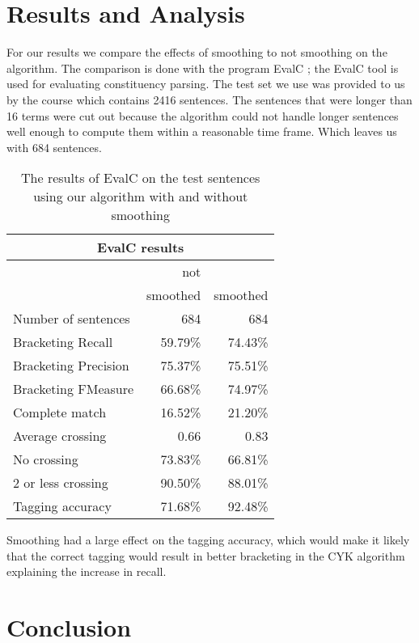\documentclass[11pt,twocolumn]{article}
\begin{document}



\section{Results and Analysis}
For our results we compare the effects of smoothing to not smoothing on the algorithm. The comparison is done with the program EvalC \cite{evalc}; the EvalC tool is used for evaluating constituency parsing. The test set we use was provided to us by the course which contains 2416 sentences. The sentences that were longer than 16 terms were cut out because the algorithm could not handle longer sentences well enough to compute them within a reasonable time frame. Which leaves us with 684 sentences.

\begin{table}[!htb]
\centering
\begin{tabular}{|l|r|r|}
\hline
\multicolumn{3}{|c|}{EvalC results}\\
\hline
& not  & \\
& smoothed & smoothed  \\
\hline
Number of sentences     & 684 & 684 \\
Bracketing Recall         &  59.79\% & 74.43\% \\
Bracketing Precision      &  75.37\% & 75.51\% \\
Bracketing FMeasure       &  66.68\% & 74.97\% \\
Complete match            &  16.52\% & 21.20\% \\
Average crossing          &   0.66 & 0.83 \\
No crossing               &  73.83\% & 66.81\% \\
2 or less crossing        &  90.50\% & 88.01\% \\
Tagging accuracy          &  71.68\% & 92.48\% \\
\hline
\end{tabular}
\caption{The results of EvalC on the test sentences using our algorithm with and without smoothing}
\label{tab:results}
\end{table}

Smoothing had a large effect on the tagging accuracy, which would make it likely that the correct tagging would result in better bracketing in the CYK algorithm explaining the increase in recall.


\section{Conclusion}
\end{document}
